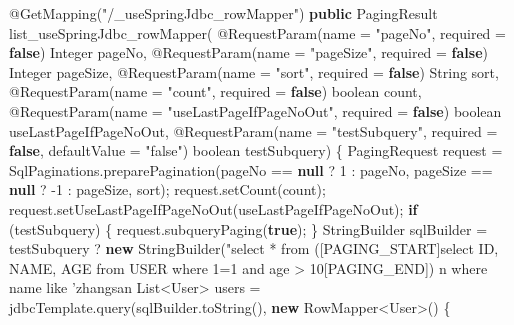 \documentclass[
]{book}
\newenvironment{Shaded}{\begin{snugshade}}{\end{snugshade}}
\newcommand{\AttributeTok}[1]{\textcolor[rgb]{0.77,0.63,0.00}{#1}}
\newcommand{\BuiltInTok}[1]{#1}
\newcommand{\DataTypeTok}[1]{\textcolor[rgb]{0.13,0.29,0.53}{#1}}
\newcommand{\DecValTok}[1]{\textcolor[rgb]{0.00,0.00,0.81}{#1}}
\newcommand{\FunctionTok}[1]{\textcolor[rgb]{0.00,0.00,0.00}{#1}}
\newcommand{\KeywordTok}[1]{\textcolor[rgb]{0.13,0.29,0.53}{\textbf{#1}}}
\newcommand{\NormalTok}[1]{#1}
\newcommand{\StringTok}[1]{\textcolor[rgb]{0.31,0.60,0.02}{#1}}
\begin{document}
\begin{Shaded}
\begin{Highlighting}[]
    \AttributeTok{@GetMapping}\NormalTok{(}\StringTok{"/_useSpringJdbc_rowMapper"}\NormalTok{)}
    \KeywordTok{public}\NormalTok{ PagingResult }\FunctionTok{list_useSpringJdbc_rowMapper}\NormalTok{(}
            \AttributeTok{@RequestParam}\NormalTok{(name = }\StringTok{"pageNo"}\NormalTok{, required = }\KeywordTok{false}\NormalTok{) }\BuiltInTok{Integer}\NormalTok{ pageNo,}
            \AttributeTok{@RequestParam}\NormalTok{(name = }\StringTok{"pageSize"}\NormalTok{, required = }\KeywordTok{false}\NormalTok{) }\BuiltInTok{Integer}\NormalTok{ pageSize,}
            \AttributeTok{@RequestParam}\NormalTok{(name = }\StringTok{"sort"}\NormalTok{, required = }\KeywordTok{false}\NormalTok{) }\BuiltInTok{String}\NormalTok{ sort,}
            \AttributeTok{@RequestParam}\NormalTok{(name = }\StringTok{"count"}\NormalTok{, required = }\KeywordTok{false}\NormalTok{) }\DataTypeTok{boolean}\NormalTok{ count,}
            \AttributeTok{@RequestParam}\NormalTok{(name = }\StringTok{"useLastPageIfPageNoOut"}\NormalTok{, required = }\KeywordTok{false}\NormalTok{) }\DataTypeTok{boolean}\NormalTok{ useLastPageIfPageNoOut,}
            \AttributeTok{@RequestParam}\NormalTok{(name = }\StringTok{"testSubquery"}\NormalTok{, required = }\KeywordTok{false}\NormalTok{, defaultValue = }\StringTok{"false"}\NormalTok{) }\DataTypeTok{boolean}\NormalTok{ testSubquery) \{}
\NormalTok{        PagingRequest request = SqlPaginations.}\FunctionTok{preparePagination}\NormalTok{(pageNo == }\KeywordTok{null}\NormalTok{ ? }\DecValTok{1}\NormalTok{ : pageNo, pageSize == }\KeywordTok{null}\NormalTok{ ? -}\DecValTok{1}\NormalTok{ : pageSize, sort);}
\NormalTok{        request.}\FunctionTok{setCount}\NormalTok{(count);}
\NormalTok{        request.}\FunctionTok{setUseLastPageIfPageNoOut}\NormalTok{(useLastPageIfPageNoOut);}
        \KeywordTok{if}\NormalTok{ (testSubquery) \{}
\NormalTok{            request.}\FunctionTok{subqueryPaging}\NormalTok{(}\KeywordTok{true}\NormalTok{);}
\NormalTok{        \}}
        \BuiltInTok{StringBuilder}\NormalTok{ sqlBuilder = testSubquery ? }\KeywordTok{new} \BuiltInTok{StringBuilder}\NormalTok{(}\StringTok{"select * from ([PAGING_START]select ID, NAME, AGE from USER where 1=1 and age > 10[PAGING_END]) n where name like 'zhangsan%' "}\NormalTok{) : }\KeywordTok{new} \BuiltInTok{StringBuilder}\NormalTok{(}\StringTok{"select ID, NAME, AGE from USER where 1=1 and age > 10"}\NormalTok{);}
        \BuiltInTok{List}\NormalTok{<User> users = jdbcTemplate.}\FunctionTok{query}\NormalTok{(sqlBuilder.}\FunctionTok{toString}\NormalTok{(), }\KeywordTok{new} \BuiltInTok{RowMapper}\NormalTok{<User>() \{}
}
\end{Highlighting}
\end{Shaded}
\end{document}
